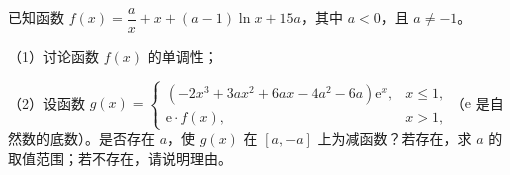 \endgroup
\begin{question}
已知函数 $f(x)=\dfrac ax+x+(a-1)\ln x+15a$，其中 $a<0$，且 $a\neq-1$。

（1）讨论函数 $f(x)$ 的单调性；

（2）设函数 $g(x)=\begin{cases}\left(-2x^3+3ax^2+6ax-4a^2-6a\right)\mathrm e^x,&x\leqslant1,\\ \mathrm e\cdot f(x),&x>1,\end{cases}$（$\mathrm e$ 是自然数的底数）。是否存在 $a$，使 $g(x)$ 在 $[a,-a]$ 上为减函数？若存在，求 $a$ 的取值范围；若不存在，请说明理由。

\end{question}